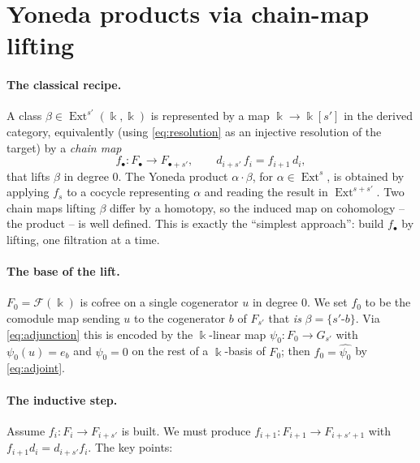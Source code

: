 \documentclass[11pt]{article}
\newcommand{\Ext}{\operatorname{Ext}}
\newcommand{\kk}{\Bbbk}
\newcommand{\tcofree}[1]{\mathcal{F}(#1)}
\theoremstyle{definition}
\begin{document}
\section{Yoneda products via chain-map lifting}

\paragraph{The classical recipe.}
A class $\beta\in\Ext^{s'}(\kk,\kk)$ is represented by a map $\kk\to\kk[s']$ in the
derived category, equivalently (using \eqref{eq:resolution} as an injective
resolution of the target) by a \emph{chain map}
\[
  f_\bullet\colon F_\bullet \longrightarrow F_{\bullet+s'},
  \qquad d_{i+s'}\,f_i = f_{i+1}\,d_i,
\]
that lifts $\beta$ in degree $0$. The Yoneda product $\alpha\cdot\beta$, for
$\alpha\in\Ext^{s}$, is obtained by applying $f_s$ to a cocycle representing
$\alpha$ and reading the result in $\Ext^{s+s'}$. Two chain maps lifting $\beta$
differ by a homotopy, so the induced map on cohomology -- the product -- is
well defined. This is exactly the ``simplest approach'': build $f_\bullet$ by
lifting, one filtration at a time.

\paragraph{The base of the lift.}
$F_0=\tcofree{\kk}$ is cofree on a single cogenerator $u$ in degree $0$. We set
$f_0$ to be the comodule map sending $u$ to the cogenerator $b$ of $F_{s'}$ that
\emph{is} $\beta=\{s'\text{-}b\}$. Via \eqref{eq:adjunction} this is encoded by the
$\kk$-linear map $\psi_0\colon F_0\to G_{s'}$ with $\psi_0(u)=e_b$ and $\psi_0=0$ on
the rest of a $\kk$-basis of $F_0$; then $f_0=\widehat{\psi_0}$ by
\eqref{eq:adjoint}.

\paragraph{The inductive step.}
Assume $f_i\colon F_i\to F_{i+s'}$ is built. We must produce
$f_{i+1}\colon F_{i+1}\to F_{i+s'+1}$ with $f_{i+1}d_i=d_{i+s'}f_i$. The key points:
\end{document}
